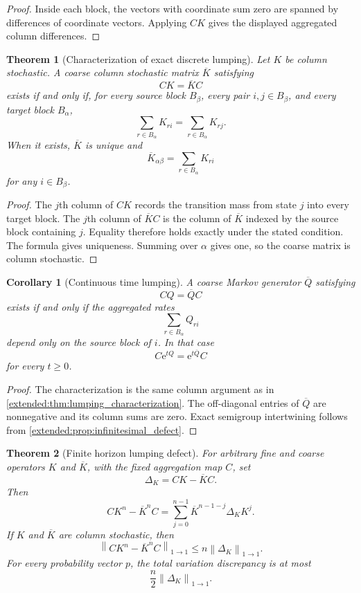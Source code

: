 \documentclass[11pt,letterpaper]{article}
\newtheorem{theorem}{Theorem}[section]
\theoremstyle{plain}
\theoremstyle{plain}
\theoremstyle{plain}
\newtheorem{corollary}[corollary]{Corollary}
\theoremstyle{definition}
\theoremstyle{definition}
\theoremstyle{definition}
\theoremstyle{definition}
\theoremstyle{definition}
\theoremstyle{remark}
\theoremstyle{remark}
\theoremstyle{remark}
\theoremstyle{remark}
\theoremstyle{remark}
\newcommand{\norm}[1]{\left\lVert#1\right\rVert}
\theoremstyle{remark}
\newcommand{\e}{\mathrm e}
\let\KomorebiPrimitivemathrm\mathrm
\renewcommand{\mathrm}[1]{{\KomorebiPrimitivemathrm{#1}}}
\begin{document}
\begin{proof}
Inside each block, the vectors with coordinate sum zero are spanned by differences of coordinate vectors. Applying \(CK\) gives the displayed aggregated column differences.
\end{proof}

\begin{theorem}[Characterization of exact discrete lumping]\label{extended:record:032}\label{extended:thm:lumping_characterization}
Let \(K\) be column stochastic. A coarse column stochastic matrix \(\overline K\) satisfying
\[
CK=\overline KC
\]
exists if and only if, for every source block \(B_\beta\), every pair \(i,j\in B_\beta\), and every target block \(B_\alpha\),
\[
\sum_{r\in B_\alpha}K_{ri}
=
\sum_{r\in B_\alpha}K_{rj}.
\]
When it exists, \(\overline K\) is unique and
\[
\overline K_{\alpha\beta}
=
\sum_{r\in B_\alpha}K_{ri}
\]
for any \(i\in B_\beta\).
\end{theorem}

\begin{proof}
The \(j\)th column of \(CK\) records the transition mass from state \(j\) into every target block. The \(j\)th column of \(\overline KC\) is the column of \(\overline K\) indexed by the source block containing \(j\). Equality therefore holds exactly under the stated condition. The formula gives uniqueness. Summing over \(\alpha\) gives one, so the coarse matrix is column stochastic.
\end{proof}

\begin{corollary}[Continuous time lumping]\label{extended:record:033}\label{extended:cor:continuous_lumping}
A coarse Markov generator \(\overline Q\) satisfying
\[
CQ=\overline QC
\]
exists if and only if the aggregated rates
\[
\sum_{r\in B_\alpha}Q_{ri}
\]
depend only on the source block of \(i\). In that case
\[
C\e^{tQ}=\e^{t\overline Q}C
\]
for every \(t\geq0\).
\end{corollary}

\begin{proof}
The characterization is the same column argument as in \cref{extended:thm:lumping_characterization}. The off-diagonal entries of \(\overline Q\) are nonnegative and its column sums are zero. Exact semigroup intertwining follows from \cref{extended:prop:infinitesimal_defect}.
\end{proof}

\begin{theorem}[Finite horizon lumping defect]\label{extended:record:034}\label{extended:thm:finite_horizon_lumping}
For arbitrary fine and coarse operators \(K\) and \(\overline K\), with the fixed aggregation map \(C\), set
\[
\Delta_K=CK-\overline KC.
\]
Then
\[
CK^n-\overline K^nC
=
\sum_{j=0}^{n-1}
\overline K^{n-1-j}\Delta_KK^j.
\]
If \(K\) and \(\overline K\) are column stochastic, then
\[
\norm{CK^n-\overline K^nC}_{1\to1}
\leq
n\norm{\Delta_K}_{1\to1}.
\]
For every probability vector \(p\), the total variation discrepancy is at most
\[
\frac n2\norm{\Delta_K}_{1\to1}.
\]
\end{theorem}
\end{document}
